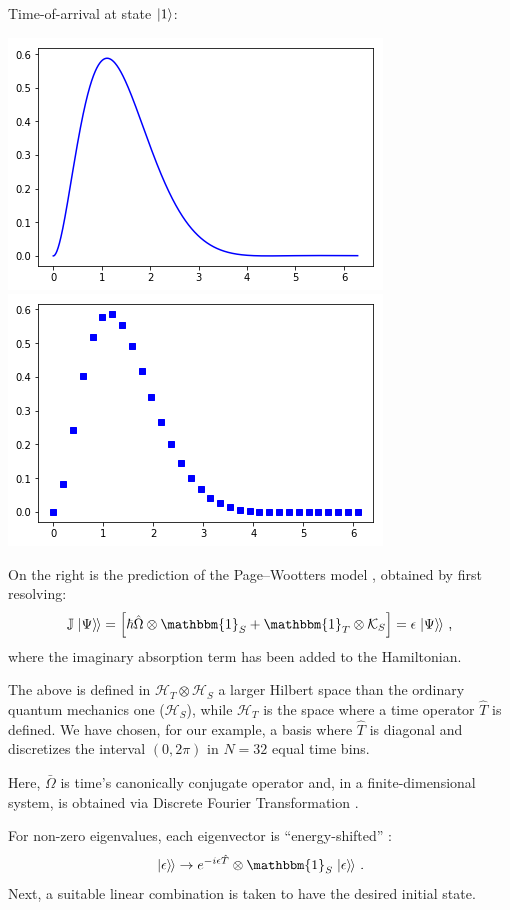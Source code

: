 \documentclass[landscape]{a0poster}
\newcommand{\idop}{\mathbbm{1}}           %
\newcommand{\hilb}[1]{\mathcal{#1}}       %
\newcommand{\ox}{\otimes}
\newcommand{\smallback}{\hspace{-0.115em}}
\newcommand{\dket}[1]{\left.\left| #1 \right\rangle\smallback\right\rangle}
\newcommand{\pwspace}{\hilb{H}_T \ox \hilb{H}_S}
\begin{document}
\begin{multicols}{3}
Time-of-arrival at state $\ket{1}$:
\begin{center}\vspace{1cm}
  \includegraphics[width=0.4\linewidth]{2ldetect/toa-cont.png}
  \includegraphics[width=0.4\linewidth]{2ldetect/toa-pw.png}
\end{center}\vspace{1cm}
On the right is the prediction of the Page--Wootters model \cite{Lloyd:Time},
obtained by first resolving:
\begin{equation}
  \mathbb{J} \dket{\Psi} = \left[ \hbar\hat{\Omega}\ox\idop_S + \idop_T\ox\mathcal{K}_S \right] = \epsilon\dket{\Psi} \,\text{,}
\end{equation}
where the imaginary absorption term has been added to the Hamiltonian.

The above is defined in $\pwspace$ a larger Hilbert space than
the ordinary quantum mechanics one ($\hilb{H}_S$), while $\hilb{H}_T$
is the space where
a time operator $\hat{T}$ is defined. We have chosen, for our example,
a basis where $\hat{T}$
is diagonal and discretizes the interval $(0, 2\pi)$ in $N=32$
equal time bins.

Here, $\bar\Omega$ is time's canonically conjugate operator and,
in a finite-dimensional system, is obtained via Discrete Fourier Transformation
\cite{FiniteHilb}.

For non-zero eigenvalues, each eigenvector
is ``energy-shifted'' \cite{Lloyd:Time}:
\begin{equation}\label{eq:energyfix}
  \dket{\epsilon} \rightarrow e^{-i\epsilon\hat{T}} \ox \idop_S \dket{\epsilon}
  \,\text{.}
\end{equation}
Next, a suitable linear combination is taken to have the desired initial state.


\end{multicols}
\end{document}
